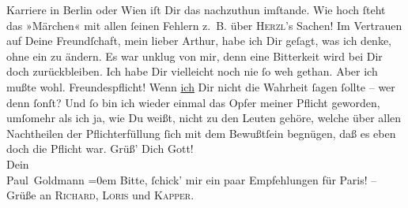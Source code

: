 \begin{ledgroupsized}[t]{13cm}
{{{                  Karriere}}}\label{K_L02674-8h} in Berlin oder Wien iſt Dir das {\pb}nachzuthun imſtande. Wie hoch ſteht das »Märchen« mit allen ſeinen Fehlern z. B. über \textsc{Herzl}’s Sachen! {\dotsfour}\pend
           \pstart
           Im Vertrauen auf Deine Freundſchaft, mein lieber Arthur, habe ich Dir geſagt, was ich
               denke, ohne ein \label{K_L02674-9v}\label{K_L02674-9h} zu ändern. Es war unklug von mir, denn eine
               Bitterkeit wird bei Dir doch zurückbleiben. Ich habe Dir vielleicht noch nie ſo weh
               gethan. Aber ich mußte wohl. Freundespflicht! Wenn \uline{ich} Dir nicht die Wahrheit ſagen ſollte – wer  denn ſonſt? Und ſo bin ich wieder einmal das Opfer meiner Pflicht geworden,
               umſomehr als ich ja, wie Du weißt, nicht zu den Leuten gehöre, welche über allen
               Nachtheilen der Pflichterfüllung ſich mit dem Bewußtſein begnügen, daß es eben doch
               die Pflicht war.\pend
           \pstart
           Grüß’ Dich Gott!{\\[\baselineskip]}Dein{\\[\baselineskip]}\spacefill\mbox{Paul Goldmann}\pend
           \leftskip=0em{}\pstart
           \noindent{}Bitte, ſchick’ mir ein paar Empfehlungen für Paris! – Grüße an \textsc{Richard}, \textsc{Loris} und \textsc{Kapper}.\pend
           
         
         \endnumbering{}\end{ledgroupsized}  \newcommand{\dateiname}{L02674}\newcommand{\titel}{Paul Goldmann an Arthur Schnitzler, 12. 12. [1891]}\newcommand{\editorInnen}{Martin Anton Müller und Laura Untner}
      
